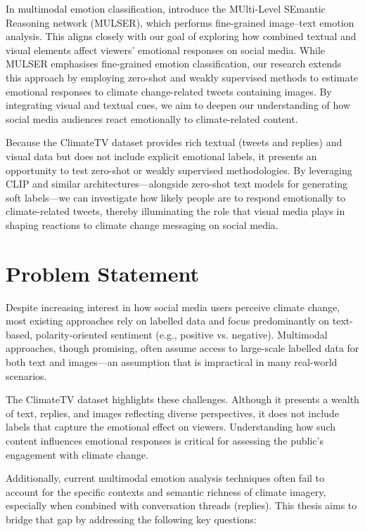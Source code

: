 In multimodal emotion classification, \citet{9920172} introduce the MUlti-Level SEmantic Reasoning network (MULSER), which performs fine-grained image–text emotion analysis. This aligns closely with our goal of exploring how combined textual and visual elements affect viewers’ emotional responses on social media. While MULSER emphasises fine-grained emotion classification, our research extends this approach by employing zero-shot and weakly supervised methods to estimate emotional responses to climate change-related tweets containing images. By integrating visual and textual cues, we aim to deepen our understanding of how social media audiences react emotionally to climate-related content.
\newline

Because the ClimateTV dataset provides rich textual (tweets and replies) and visual data but does not include explicit emotional labels, it presents an opportunity to test zero-shot or weakly supervised methodologies. By leveraging CLIP and similar architectures—alongside zero-shot text models for generating soft labels—we can investigate how likely people are to respond emotionally to climate-related tweets, thereby illuminating the role that visual media plays in shaping reactions to climate change messaging on social media.

\section{Problem Statement}

Despite increasing interest in how social media users perceive climate change, most existing approaches rely on labelled data and focus predominantly on text-based, polarity-oriented sentiment (e.g., positive vs. negative). Multimodal approaches, though promising, often assume access to large-scale labelled data for both text and images—an assumption that is impractical in many real-world scenarios.
\newline

The ClimateTV dataset highlights these challenges. Although it presents a wealth of text, replies, and images reflecting diverse perspectives, it does not include labels that capture the emotional effect on viewers. Understanding how such content influences emotional responses is critical for assessing the public’s engagement with climate change.
\newline

Additionally, current multimodal emotion analysis techniques often fail to account for the specific contexts and semantic richness of climate imagery, especially when combined with conversation threads (replies). This thesis aims to bridge that gap by addressing the following key questions:


